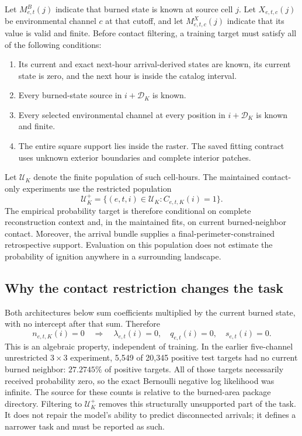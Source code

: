 \documentclass[11pt,a4paper]{article}
\begin{document}
Let $M^B_{e,t}(j)$ indicate that burned state is known at source cell $j$.
Let $X_{e,t,c}(j)$ be environmental channel $c$ at that cutoff, and let
$M^X_{e,t,c}(j)$ indicate that its value is valid and finite. Before contact
filtering, a training target must satisfy all of the following conditions:
\begin{enumerate}
 \item Its current and exact next-hour arrival-derived states are known, its
 current state is zero, and the next hour is inside the catalog interval.
 \item Every burned-state source in $i+\mathcal D_K$ is known.
 \item Every selected environmental channel at every position in
 $i+\mathcal D_K$ is known and finite.
 \item The entire square support lies inside the raster. The saved fitting
 contract uses unknown exterior boundaries and complete interior patches.
\end{enumerate}
Let $\mathcal U_K$ denote the finite population of such cell-hours. The
maintained contact-only experiments use the restricted population
\begin{equation}
 \mathcal U_K^+=\{(e,t,i)\in\mathcal U_K:C_{e,t,K}(i)=1\}.
 \label{eq:prob-population}
\end{equation}
The empirical probability target is therefore conditional on complete
reconstruction context and, in the maintained fits, on current burned-neighbor
contact. Moreover, the arrival bundle supplies a final-perimeter-constrained
retrospective support. Evaluation on this population does not estimate the
probability of ignition anywhere in a surrounding landscape.

\subsection{Why the contact restriction changes the task}

Both architectures below sum coefficients multiplied by the current burned
state, with no intercept after that sum. Therefore
\begin{equation}
 n_{e,t,K}(i)=0\quad\Longrightarrow\quad
 \lambda_{e,t}(i)=0,\quad q_{e,t}(i)=0,\quad s_{e,t}(i)=0.
 \label{eq:prob-no-contact-zero}
\end{equation}
This is an algebraic property, independent of training. In the earlier
five-channel unrestricted $3\times3$ experiment, 5,549 of 20,345 positive
test targets had no current burned neighbor: $27.2745\%$ of positive targets.
All of those targets necessarily received probability zero, so the exact
Bernoulli negative log likelihood was infinite. The source for these counts is
relative to the burned-area package directory. Filtering to
$\mathcal U_K^+$ removes this structurally unsupported part of the task.
It does not repair the model's ability to predict disconnected arrivals; it
defines a narrower task and must be reported as such.
\end{document}
